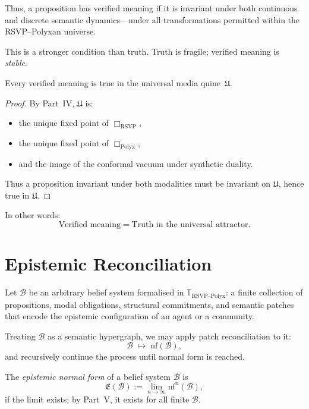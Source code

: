 Thus, a proposition has verified meaning if it is invariant under both continuous and
discrete semantic dynamics—under all transformations permitted within the RSVP--Polyxan universe.

This is a stronger condition than truth.  
Truth is fragile; verified meaning is \emph{stable}.

\begin{proposition}
Every verified meaning is true in the universal media quine~$\mathfrak{U}$.
\end{proposition}

\begin{proof}
By Part~IV, $\mathfrak{U}$ is:
\begin{itemize}
\item the unique fixed point of $\Box_{\mathrm{RSVP}}$,
\item the unique fixed point of $\Box_{\mathrm{Polyx}}$,
\item and the image of the conformal vacuum under synthetic duality.
\end{itemize}
Thus a proposition invariant under both modalities must be invariant on $\mathfrak{U}$,
hence true in $\mathfrak{U}$.
\end{proof}

In other words:  
\[
\text{Verified meaning} = \text{Truth in the universal attractor}.
\]


\section{Epistemic Reconciliation}

Let $\mathcal{B}$ be an arbitrary belief system formalised in $\mathbb{T}_{\mathrm{RSVP\text{--}Polyx}}$:
a finite collection of propositions, modal obligations, structural commitments, and
semantic patches that encode the epistemic configuration of an agent or a community.

Treating $\mathcal{B}$ as a semantic hypergraph, we may apply patch reconciliation to it:
\[
\mathcal{B} \;\longmapsto\; \mathrm{nf}(\mathcal{B}),
\]
and recursively continue the process until normal form is reached.

\begin{definition}
The \emph{epistemic normal form} of a belief system $\mathcal{B}$ is
\[
\mathfrak{E}(\mathcal{B}) := \lim_{n\to\infty} \mathrm{nf}^n(\mathcal{B}),
\]
if the limit exists; by Part~V, it exists for all finite $\mathcal{B}$.
\end{definition}

